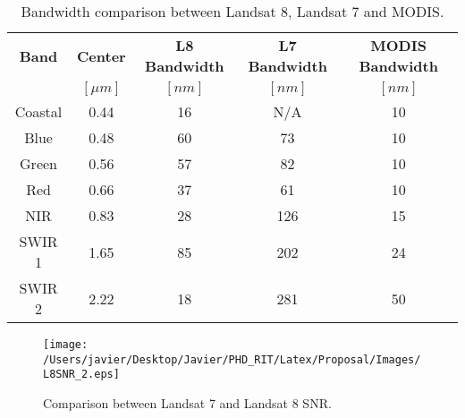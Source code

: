 \begin{table}[!ht]
\caption{ Bandwidth comparison between Landsat 8, Landsat 7 and MODIS. \label{tab:bandwidth}} 
\centering
      \begin{tabular}{c|c|c|c|c}
          \bfseries{Band}& \bfseries{Center}   & \bfseries{L8 Bandwidth} & \bfseries{L7 Bandwidth} & \bfseries{MODIS Bandwidth} \\ 
                  & \bfseries{$[\mu m]$} & $[nm]$   & $[nm]$ & $[nm]$   \\ \hline \hline
          Coastal & 0.44 & 16 & N/A & 10  \\
          Blue    & 0.48 & 60 & 73  & 10  \\
          Green   & 0.56 & 57 & 82  & 10  \\
          Red     & 0.66 & 37 & 61  & 10  \\  
          NIR     & 0.83 & 28 & 126 & 15  \\
          SWIR 1  & 1.65 & 85 & 202 & 24  \\
          SWIR 2  & 2.22 & 18 & 281 & 50  \\ 
       \end{tabular}
\end{table}

\begin{figure}[htb]
\centering
      \texttt{[image: /Users/javier/Desktop/Javier/PHD\_RIT/Latex/Proposal/Images/L8SNR\_2.eps]}
      \caption{Comparison between Landsat 7 and Landsat 8 SNR. \label{fig:L8SNR} } 
      \label{fig:olisnr}
\end{figure}


